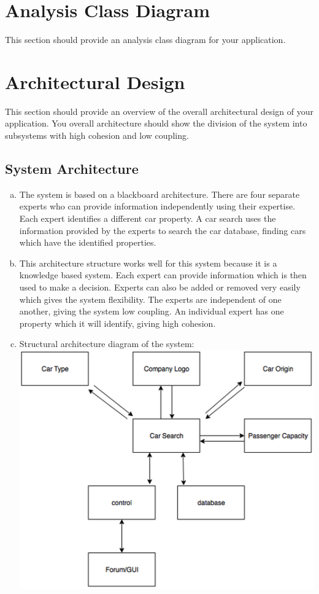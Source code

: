 \documentclass[12pt]{article}
\begin{document}
\section{Analysis Class Diagram}
\label{sec:analysis_class_diagram}
This section should provide an analysis class diagram for your application.


\section{Architectural Design}
\label{sec:architectural_design}
This section should provide an overview of the overall architectural design of your application. You overall architecture should show the division of the system into subsystems with high cohesion and low coupling.

\subsection{System Architecture}
\label{sub:system_architecture}
\begin{enumerate}[a)]
	\item The system is based on a blackboard architecture. There are four separate experts who can provide information independently using their expertise. Each expert identifies a different car property. A car search uses the information provided by the experts to search the car database, finding cars which have the identified properties.
	\item This architecture structure works well for this system because it is a knowledge based system. Each expert can provide information which is then used to make a decision. Experts can also be added or removed very easily which gives the system flexibility. The experts are independent of one another, giving the system low coupling. An individual expert has one property which it will identify, giving high cohesion.
	\item Structural architecture diagram of the system:
	\includegraphics{Structural.png}
\end{enumerate}
\end{document}
